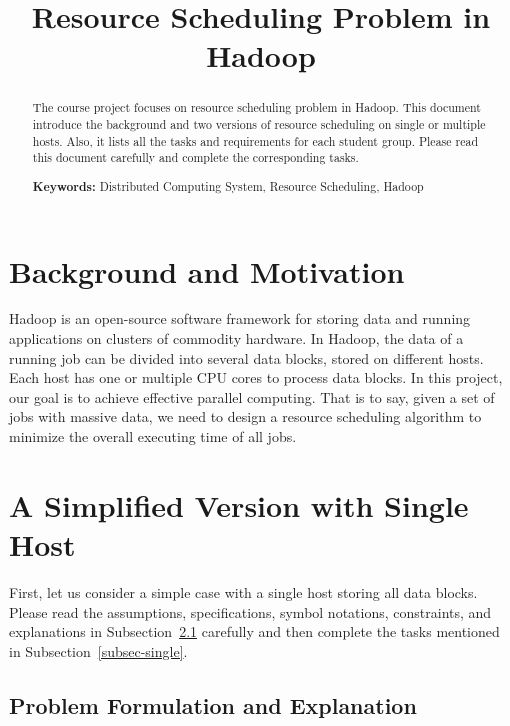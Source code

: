 \documentclass{llncs}
\title{Resource Scheduling Problem in Hadoop}
\subtitle{\color{blue}{Project for Algorithm and Complexity Course} \vspace{-6mm}}
\author{}
\institute{Department of Computer Science and Engineering, \\ Shanghai Jiao Tong University, Shanghai, China}
\begin{document}



\maketitle
\begin{abstract}\vspace{-5mm}

The course project focuses on resource scheduling problem in Hadoop. This document introduce the background and two versions of resource scheduling on single or multiple hosts. Also, it lists all the tasks and requirements for each student group. Please read this document carefully and complete the corresponding tasks.

\textbf{Keywords:} Distributed Computing System, Resource Scheduling, Hadoop
\end{abstract}

\section{Background and Motivation}
\label{sec-Hadoop}

Hadoop is an open-source software framework for storing data and running applications on clusters of commodity hardware. In Hadoop, the data of a running job can be divided into several data blocks, stored on different hosts. Each host has one or multiple CPU cores to process data blocks. In this project, our goal is to achieve effective parallel computing. That is to say, given a set of jobs with massive data, we need to design a resource scheduling algorithm to minimize the overall executing time of all jobs.



\section{A Simplified Version with Single Host}
\label{sec-problem1}

First, let us consider a simple case with a single host storing all data blocks. Please read the assumptions, specifications, symbol notations, constraints, and explanations in Subsection~\ref{subsec-preliminary} carefully and then complete the tasks mentioned in Subsection~\ref{subsec-single}.

\subsection{Problem Formulation and Explanation} \label{subsec-preliminary}
\end{document}
